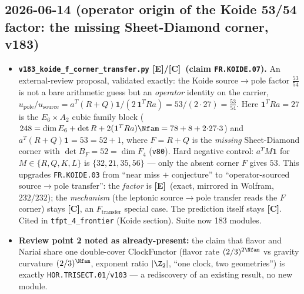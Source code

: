 \documentclass[11pt]{article}
\providecommand{\mE}{\textbf{[E]}}\providecommand{\mC}{\textbf{[C]}}
\providecommand{\vref}[1]{\texttt{#1}}
\begin{document}
\subsection*{2026-06-14 (operator origin of the Koide 53/54 factor: the missing Sheet-Diamond corner, v183)}
\begin{itemize}
\item \textbf{\texttt{v183\_koide\_f\_corner\_transfer.py} \mE/\mC\ (claim \texttt{FR.KOIDE.07}).} An
  external-review proposal, validated exactly: the Koide source$\to$pole factor $\tfrac{53}{54}$ is not
  a bare arithmetic guess but an \emph{operator} identity on the carrier,
  $u_{\mathrm{pole}}/u_{\mathrm{source}} = a^T(R+Q)\mathbf1 / (2\,\mathbf1^T R a) = 53/(2{\cdot}27) =
  \tfrac{53}{54}$. Here $\mathbf1^T R a = 27$ is the $E_6{\times}A_2$ cubic family block
  ($248 = \dim E_6 + \det R + 2(\mathbf1^T R a)\Nfam = 78+8+2{\cdot}27{\cdot}3$) and
  $a^T(R+Q)\mathbf1 = 53 = 52+1$, where $F = R+Q$ is the \emph{missing} Sheet-Diamond corner with
  $\det B_F = 52 = \dim F_4$ (\vref{v80}). Hard negative control: $a^T M\mathbf1$ for $M\in\{R,Q,K,L\}$
  is $\{32,21,35,56\}$ --- only the absent corner $F$ gives $53$. This upgrades \texttt{FR.KOIDE.03}
  from ``near miss $+$ conjecture'' to ``operator-sourced source$\to$pole transfer'': the \emph{factor}
  is \mE\ (exact, mirrored in Wolfram, $232/232$); the \emph{mechanism} (the leptonic source$\to$pole
  transfer reads the $F$ corner) stays \mC, an $F_{\mathrm{transfer}}$ special case. The prediction
  itself stays \mC. Cited in \texttt{tfpt\_4\_frontier} (Koide section). Suite now 183 modules.
\item \textbf{Review point 2 noted as already-present:} the claim that flavor and Nariai share one
  double-cover ClockFunctor (flavor rate $(2/3)^{2\Nfam}$ vs gravity curvature $(2/3)^{\Nfam}$, exponent
  ratio $|\Z_2|$, ``one clock, two geometries'') is exactly \texttt{HOR.TRISECT.01}/\vref{v103} --- a
  rediscovery of an existing result, no new module.
\end{itemize}
\end{document}
